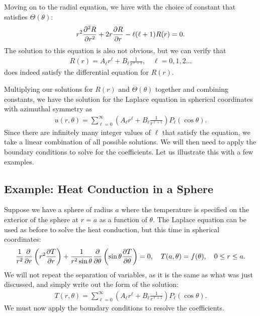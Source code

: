 Moving on to the radial equation, we have with the choice of constant that satisfies $\Theta(\theta)$:
\begin{align}
  r^2 \frac{ \partial^2 {R} }{ \partial {r}^2 } + 2 r \frac{ \partial {R} }{ \partial {r} } - \ell ( \ell + 1 ) R(r) = 0 .
\end{align}
The solution to this equation is also not obvious, but we can verify that
\begin{align}
  R(r) = A_\ell r^\ell + B_\ell \frac{1}{r^{\ell+1}}, \quad \ell = 0, 1, 2 \ldots
\end{align}
does indeed satisfy the differential equation for $R(r)$.

Multiplying our solutions for $R(r)$ and $\Theta(\theta)$ together and combining constants, we have the solution for the Laplace equation in spherical coordinates with azimuthal symmetry as
\begin{align}
  u(r,\theta) = \sum_{\ell = 0}^\infty \left( A_\ell r^\ell + B_\ell \frac{1}{r^{\ell+1}} \right) P_\ell( \cos \theta ) .
\end{align}
Since there are infinitely many integer values of $\ell$ that satisfy the equation, we take a linear combination of all possible solutions. We will then need to apply the boundary conditions to solve for the coefficients. Let us illustrate this with a few examples.

\subsection{Example: Heat Conduction in a Sphere}

Suppose we have a sphere of radius $a$ where the temperature is specified on the exterior of the sphere at $r = a$ as a function of $\theta$. The Laplace equation can be used as before to solve the heat conduction, but this time in spherical coordinates:
\begin{align}
  \frac{1}{r^2} \frac{ \partial {} }{ \partial {r} } \left( r^2 \frac{ \partial {T} }{ \partial {r} } \right) 
               + \frac{1}{r^2 \sin \theta } \frac{ \partial {} }{ \partial {\theta} } \left( \sin \theta \frac{ \partial {T} }{ \partial {\theta} } \right) = 0 , \quad T(a,\theta) = f(\theta), \quad 0 \le r \le a .
\end{align}
We will not repeat the separation of variables, as it is the same as what was just discussed, and simply write out the form of the solution:
\begin{align}
  T(r,\theta) = \sum_{\ell = 0}^\infty \left( A_\ell r^\ell + B_\ell \frac{1}{r^{\ell+1}} \right) P_\ell( \cos \theta ) . \nonumber
\end{align}
We must now apply the boundary conditions to resolve the coefficients.

